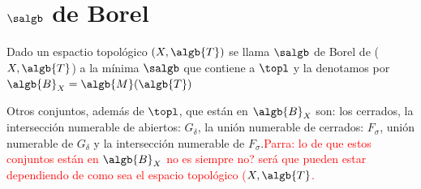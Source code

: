 \documentclass{apuntes}
\begin{document}
\section{$\salgb$ de Borel}
\begin{defn}
Dado un espactio topológico $(X,\algb{T})$ se llama $\salgb$ de Borel de ($X, \algb{T}$) a la mínima $\salgb$ que contiene a $\topl$ y la denotamos por $\algb{B}_X=\algb{M}(\algb{T})$

\end{defn}

\obs Otros conjuntos, además de $\topl$, que están en $\algb{B}_X$ son: los cerrados, la intersección numerable de abiertos: $G_\delta$, la unión numerable de cerrados: $F_\sigma$, unión numerable de $G_\delta$ y la intersección numerable de $F_\sigma$.\textcolor{red}{Parra: lo de que estos conjuntos están en $\algb{B}_X$ no es siempre no? será que pueden estar dependiendo de como sea el espacio topológico ($X, \algb{T}$.}
\end{document}
